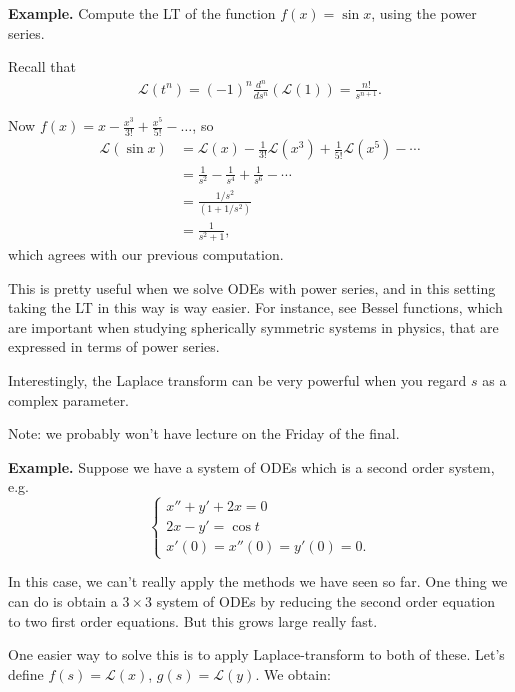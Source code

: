 \documentclass{article}
\newcommand{\LL}{\mathcal{L}}
\begin{document}
{\bf Example.} Compute the LT of the function $f(x) = \sin x$, using the power series.

Recall that
\begin{align*}
  \LL \left( t^n \right) = (-1)^n \frac{d^n}{ds^n} \left( \LL (1) \right) = \frac{n!}{s^{n+1}}.
\end{align*}

Now $f(x) = x - \frac{x^3}{3!} + \frac{x^5}{5!} - \dots$, so
\begin{align*}
  \LL(\sin x) &= \LL (x) -  \frac{1}{3!} \LL(x^3) + \frac{1}{5!} \LL(x^5) - \cdots \\
  &= \frac{1}{s^2} - \frac{1}{s^4} + \frac{1}{s^6} - \cdots \\
  &= \frac{1/s^2}{(1 + 1/s^2)} \\
  &= \frac{1}{s^2 + 1},
\end{align*}
which agrees with our previous computation.

This is pretty useful when we solve ODEs with power series, and in this setting taking the LT in this way is way easier.  For instance, see Bessel functions, which are important when studying spherically symmetric systems in physics, that are expressed in terms of power series.

Interestingly, the Laplace transform can be very powerful when you regard $s$ as a complex parameter.

Note: we probably won't have lecture on the Friday of the final.

{\bf Example.} Suppose we have a system of ODEs which is a second order system, e.g.
\[
\begin{cases}
  x'' + y' + 2x = 0 \\
  2x - y' = \cos t \\
  x'(0) = x''(0) = y'(0) = 0.
\end{cases}
\]

In this case, we can't really apply the methods we have seen so far.  One thing we can do is obtain a $3 \times 3$ system of ODEs by reducing the second order equation to two first order equations.  But this grows large really fast.

One easier way to solve this is to apply Laplace-transform to both of these.  Let's define $f(s) = \LL (x)$, $g(s) = \LL (y)$.  We obtain:
\end{document}
